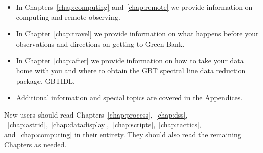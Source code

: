 \begin{itemize}
\item In Chapters~\ref{chap:computing} and~\ref{chap:remote} we provide
information on computing and remote observing.

\item In Chapter~\ref{chap:travel} we provide information on what happens before
your observations and directions on getting to Green Bank.

\item In Chapter~\ref{chap:after} we provide information on how to take your data 
home with you and where to obtain the \gls{GBT} spectral line data reduction package,
\gls{GBTIDL}.


\item Additional information and special topics are covered in the Appendices.

\end{itemize}

New users should read Chapters~\ref{chap:process},~\ref{chap:dss},
~\ref{chap:astrid},~\ref{chap:datadisplay},~\ref{chap:scripts},~\ref{chap:tactics},
and~\ref{chap:computing} in their entirety.  They should also read the
remaining Chapters as needed.
